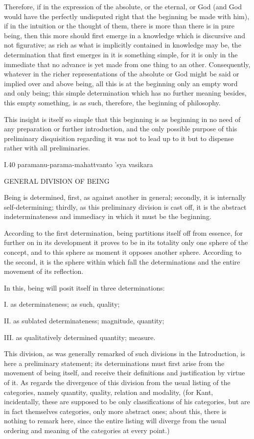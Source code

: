 Therefore, if in the expression of the absolute,
or the eternal, or God
(and God would have the perfectly undisputed right
that the beginning be made with him),
if in the intuition or the thought of them,
there is more than there is in pure being,
then this more should first emerge in a knowledge
which is discursive and not figurative;
as rich as what is implicitly contained in knowledge may be,
the determination that first emerges in it is something simple,
for it is only in the immediate that no advance is
yet made from one thing to an other.
Consequently, whatever in the richer
representations of the absolute or God
might be said or implied over and above being,
all this is at the beginning
only an empty word and only being;
this simple determination which has no further meaning
besides, this empty something, is as such, therefore,
the beginning of philosophy.

This insight is itself so simple that this beginning is
as beginning in no need of any preparation or further introduction,
and the only possible purpose of this preliminary disquisition regarding it
was not to lead up to it but to dispense rather with all preliminaries.

I.40
paramanu-parama-mahattvanto 'sya vasikara

GENERAL DIVISION OF BEING

Being is determined, first, as against another in general;
secondly, it is internally self-determining;
thirdly, as this preliminary division is cast off,
it is the abstract indeterminateness and immediacy
in which it must be the beginning.

According to the first determination,
being partitions itself off from essence,
for further on in its development it proves to be
in its totality only one sphere of the concept,
and to this sphere as moment it opposes another sphere.
According to the second, it is the sphere
within which fall the determinations
and the entire movement of its reflection.

In this, being will posit itself in three determinations:

I. as determinateness; as such, quality;

II. as sublated determinateness; magnitude, quantity;

III. as qualitatively determined quantity; measure.

This division, as was generally remarked of
such divisions in the Introduction,
is here a preliminary statement;
its determinations must first arise
from the movement of being itself,
and receive their definitions and justification by virtue of it.
As regards the divergence of this division from
the usual listing of the categories,
namely quantity, quality, relation and modality,
(for Kant, incidentally, these are supposed to be
only classifications of his categories,
but are in fact themselves categories,
only more abstract ones;
about this, there is nothing to remark here,
since the entire listing will diverge from
the usual ordering and meaning of
the categories at every point.)

